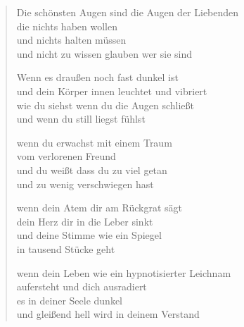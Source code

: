 
\cleartoverso


\begin{verse}

Die schönsten Augen sind die Augen der Liebenden\\
die nichts haben wollen\\
und nichts halten müssen\\
und nicht zu wissen glauben wer sie sind

Wenn es draußen noch fast dunkel ist\\
und dein Körper innen leuchtet und vibriert\\
wie du siehst wenn du die Augen schließt\\
und wenn du still liegst fühlst

wenn du erwachst mit einem Traum\\
vom verlorenen Freund\\
und du weißt dass du zu viel getan\\
und zu wenig verschwiegen hast

wenn dein Atem dir am Rückgrat sägt\\
dein Herz dir in die Leber sinkt\\
und deine Stimme wie ein Spiegel\\
in tausend Stücke geht

wenn dein Leben wie ein hypnotisierter Leichnam\\
aufersteht und dich ausradiert\\
es in deiner Seele dunkel\\
und gleißend hell wird in deinem Verstand
\end{verse}

\clearpage



